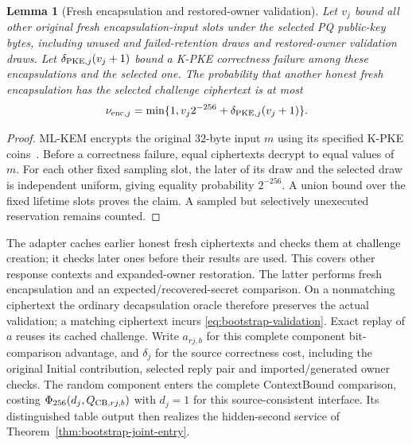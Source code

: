 \documentclass[pdflatex]{sn-jnl}
\theoremstyle{thmstyleone}
\newtheorem{lemma}[theorem]{Lemma}
\theoremstyle{thmstylethree}
\theoremstyle{thmstyletwo}
\begin{document}
\begin{lemma}[Fresh encapsulation and restored-owner validation]
\label{lem:bootstrap-validation}
Let $v_j$ bound all other original fresh encapsulation-input slots under
the selected PQ public-key bytes, including unused and failed-retention
draws and restored-owner validation draws. Let
$\delta_{{\rm PKE},j}(v_j+1)$ bound a K-PKE correctness failure among
these encapsulations and the selected one. The probability that another
honest fresh encapsulation has the selected challenge ciphertext is at most
\begin{equation}
 \nu_{{\rm enc},j}=\min\{1,v_j2^{-256}
                   +\delta_{{\rm PKE},j}(v_j+1)\}.
 \label{eq:bootstrap-validation}
\end{equation}
\end{lemma}
\begin{proof}
ML-KEM encrypts the original 32-byte input $m$ using its specified
K-PKE coins~\cite[Algorithms~14, 15, 17 and 18]{fips203}. Before a
correctness failure, equal ciphertexts decrypt to equal values of $m$.
For each other fixed sampling slot, the later of its draw and the
selected draw is independent uniform, giving equality probability
$2^{-256}$. A union bound over the fixed lifetime slots proves the
claim. A sampled but selectively unexecuted reservation remains counted.
\end{proof}

The adapter caches earlier honest fresh ciphertexts and checks them at
challenge creation; it checks later ones before their results are used.
This covers other response contexts and expanded-owner restoration.
The latter performs fresh encapsulation and an expected/recovered-secret
comparison. On a nonmatching ciphertext the ordinary decapsulation oracle
therefore preserves the actual validation; a matching ciphertext incurs
\eqref{eq:bootstrap-validation}. Exact replay of $a$ reuses its cached
challenge. Write $a_{rj,b}$ for this complete component bit-comparison
advantage, and $\delta_j$ for the source correctness cost, including the
original Initial contribution, selected reply pair and imported/generated
owner checks. The random component enters the complete ContextBound
comparison, costing $\Phi_{256}(d_j,Q_{{\rm CB},rj,b})$ with $d_j=1$
for this source-consistent interface. Its distinguished table output
then realizes the hidden-second service of
Theorem~\ref{thm:bootstrap-joint-entry}.
\end{document}
